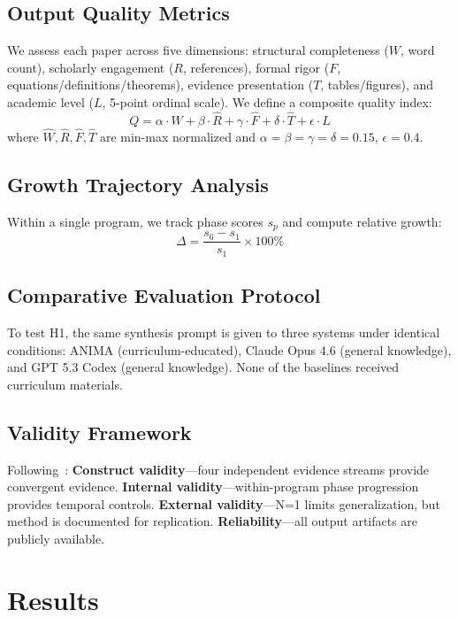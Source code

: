 \documentclass[11pt,a4paper]{article}
\begin{document}
\subsection{Output Quality Metrics}
We assess each paper across five dimensions: structural completeness ($W$, word count), scholarly engagement ($R$, references), formal rigor ($F$, equations/definitions/theorems), evidence presentation ($T$, tables/figures), and academic level ($L$, 5-point ordinal scale). We define a composite quality index:
\begin{equation}
Q = \alpha \cdot \hat{W} + \beta \cdot \hat{R} + \gamma \cdot \hat{F} + \delta \cdot \hat{T} + \epsilon \cdot L
\label{eq:quality}
\end{equation}
where $\hat{W}, \hat{R}, \hat{F}, \hat{T}$ are min-max normalized and $\alpha{=}\beta{=}\gamma{=}\delta{=}0.15$, $\epsilon{=}0.4$.

\subsection{Growth Trajectory Analysis}
Within a single program, we track phase scores $s_p$ and compute relative growth:
\begin{equation}
\Delta = \frac{s_6 - s_1}{s_1} \times 100\%
\label{eq:growth}
\end{equation}

\subsection{Comparative Evaluation Protocol}
To test H1, the same synthesis prompt is given to three systems under identical conditions: ANIMA (curriculum-educated), Claude Opus 4.6 (general knowledge), and GPT 5.3 Codex (general knowledge). None of the baselines received curriculum materials.

\subsection{Validity Framework}
Following~\citet{yin2018case}: \textbf{Construct validity}---four independent evidence streams provide convergent evidence. \textbf{Internal validity}---within-program phase progression provides temporal controls. \textbf{External validity}---N=1 limits generalization, but method is documented for replication. \textbf{Reliability}---all output artifacts are publicly available.

\section{Results}\label{sec:results}
\end{document}
